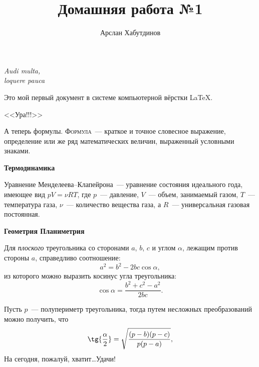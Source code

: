 \documentclass[11pt]{article}
\title{Домашняя работа №1}
\author{Арслан Хабутдинов}
\date{}
\begin{document}
	\maketitle
	\begin{flushright}
	    {\small{\textit{Audi multa, \\ loquere pauca}}}
	\end{flushright}
	\vspace{10pt}
	\begin{center}
	    Это мой первый документ в системе компьютерной вёрстки \LaTeX.
	\end{center}
	\begin{center}
	    {\Huge \sffamily 
	    <<Ура!!!>>}
	\end{center}
	\hspace{14pt} А теперь формулы. \textsc{Формула}~--- краткое и точное словесное выражение, определение или же ряд математических величин, выраженный условными знаками.
	\vspace{15pt}
	
	{\hspace{14pt} \bfseries \Large Термодинамика}
	
	Уравнение Менделеева--Клапейрона~--- уравнение состояния идеального года, имеющее вид $pV = \nu RT$, где $p$~--- давление, $V$~--- объем, занимаемый газом, $T$~--- температура газа, $\nu$~--- количество вещества газа, а $R$~--- универсальная газовая постоянная.
	\vspace{15pt}
	
	{\hspace{14pt} \bfseries \Large Геометрия \hfill Планиметрия}
	
	Для \textsl{плоского} треугольника со сторонами $a$, $b$, $c$ и углом $\alpha$, лежащим против стороны $a$, справедливо соотношение:
	$$
	a^2 = b^2 - 2bc \cos{\alpha},
	$$
	из которого можно выразить косинус угла треугольника:
	$$
	\cos{\alpha} = \frac{b^2 + c^2 - a^2}{2bc}.
	$$
	
	Пусть $p$~--- полупериметр треугольника, тогда путем несложных преобразований можно получить, что 
	$$
	\tg{\frac{\alpha}{2}} = \sqrt{\frac{(p - b)(p - c)}{p(p - a)}},
	$$
	\vspace{1cm}
	\noindent На сегодня, пожалуй, хватит\dots Удачи!
\end{document}
